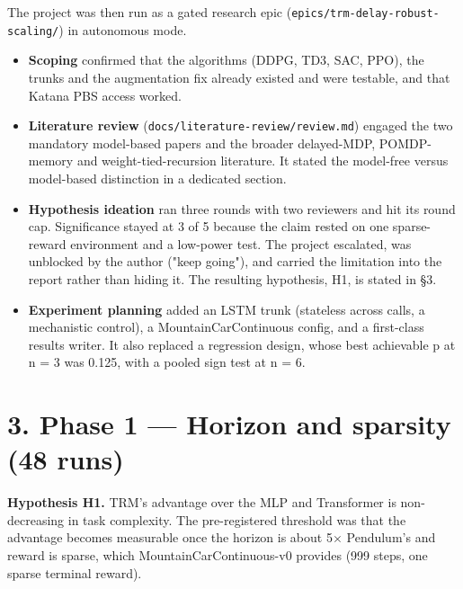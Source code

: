 \documentclass[11pt]{article}
\begin{document}
The project was then run as a gated research epic (\texttt{epics/\allowbreak{}trm-delay-robust-scaling/\allowbreak{}}) in autonomous mode.



\begin{itemize}
\item \textbf{Scoping} confirmed that the algorithms (DDPG, TD3, SAC, PPO), the trunks and the augmentation fix already existed and were testable, and that Katana PBS access worked.
\item \textbf{Literature review} (\texttt{docs/\allowbreak{}literature-review/\allowbreak{}review.\allowbreak{}md}) engaged the two mandatory model-based papers and the broader delayed-MDP, POMDP-memory and weight-tied-recursion literature. It stated the model-free versus model-based distinction in a dedicated section.
\item \textbf{Hypothesis ideation} ran three rounds with two reviewers and hit its round cap. Significance stayed at 3 of 5 because the claim rested on one sparse-reward environment and a low-power test. The project escalated, was unblocked by the author ("keep going"), and carried the limitation into the report rather than hiding it. The resulting hypothesis, H1, is stated in \S{}3.
\item \textbf{Experiment planning} added an LSTM trunk (stateless across calls, a mechanistic control), a MountainCarContinuous config, and a first-class results writer. It also replaced a regression design, whose best achievable p at n = 3 was 0.125, with a pooled sign test at n = 6.
\end{itemize}



\medskip



\section*{3. Phase 1 --- Horizon and sparsity (48 runs)}



\textbf{Hypothesis H1.} TRM's advantage over the MLP and Transformer is non-decreasing in task complexity. The pre-registered threshold was that the advantage becomes measurable once the horizon is about 5$\times$ Pendulum's and reward is sparse, which MountainCarContinuous-v0 provides (999 steps, one sparse terminal reward).
\end{document}
